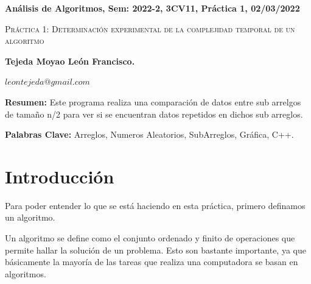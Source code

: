 \documentclass[12pt,twoside]{article}
\date{}
\begin{document}
\begin{figure}[h]
\vspace{-3cm} \hspace{-2cm} \setlength{\unitlength}{1mm}

\end{figure}


\vspace{0cm}

\centerline{\bf An\'alisis de Algoritmos, Sem: 2022-2, 3CV11, Pr\'actica 1, 02/03/2022}

\centerline{}



\begin{center}
\Large{\textsc{Pr\'actica 1: Determinaci\'on experimental de la complejidad temporal de un algoritmo}}
\end{center}
\centerline{}
\centerline{\bf {Tejeda Moyao Le\'on Francisco.}}
\centerline{}
\centerline{$leontejeda@gmail.com$}



\newtheorem{Theorem}{\quad Theorem}[section]

\newtheorem{Definition}[Theorem]{\quad Definition}

\newtheorem{Corollary}[Theorem]{\quad Corollary}

\newtheorem{Lemma}[Theorem]{\quad Lemma}

\newtheorem{Example}[Theorem]{\quad Example}

\bigskip

\textbf{Resumen:} Este programa realiza una comparaci\'on de datos entre sub arrelgos de tamaño n/2 para ver si se encuentran datos repetidos en dichos sub arreglos.




{\bf Palabras Clave:} Arreglos, Numeros Aleatorios, SubArreglos, Gr\'afica, C++.

\section{Introducci\'on}

Para poder entender lo que se est\'a haciendo en esta pr\'actica, primero definamos un algoritmo.

Un algoritmo se define como el conjunto ordenado y finito de operaciones que permite hallar la solución de un problema. Esto son bastante importante, ya que b\'asicamente la mayoría de las tareas que realiza una computadora se basan en algoritmos.
\end{document}
